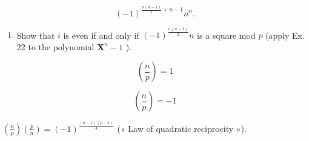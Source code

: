 \[
(- 1) ^ {\frac {n (n - 1)}{2} + n - 1} n ^ {n}.
\]

\begin{enumerate}
\def\labelenumi{\alph{enumi})}
\setcounter{enumi}{2}
\tightlist
\item
  Show that \(i\) is even if and only if \((-1)^{\frac{n(n - 1)}{2}} n\) is a square mod \(p\) (apply Ex. 22 to the polynomial \(\mathbf{X}^n - 1\) ).
\end{enumerate}

\[
\left(\frac {n}{p}\right) = 1
\]

\[
\left(\frac {n}{p}\right) = - 1
\]

\(\left(\frac{n}{p}\right)\left(\frac{p}{n}\right) = (-1)^{\frac{(n - 1)(p - 1)}{4}}\) (« Law of quadratic reciprocity »).
\relax{}

